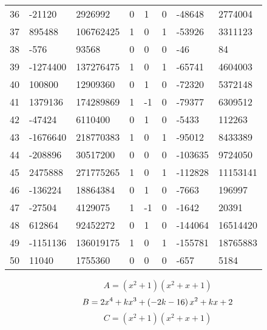 \documentclass{amsart}
\begin{document}
\begin{longtable}{|l|l|l|lllll|}
36&-21120&2926992&0&1&0&-48648&2774004\\
37&895488&106762425&1&0&1&-53926&3311123\\
38&-576&93568&0&0&0&-46&84\\
39&-1274400&137276475&1&0&1&-65741&4604003\\
40&100800&12909360&0&1&0&-72320&5372148\\
41&1379136&174289869&1&-1&0&-79377&6309512\\
42&-47424&6110400&0&1&0&-5433&112263\\
43&-1676640&218770383&1&0&1&-95012&8433389\\
44&-208896&30517200&0&0&0&-103635&9724050\\
45&2475888&271775265&1&0&1&-112828&11153141\\
46&-136224&18864384&0&1&0&-7663&196997\\
47&-27504&4129075&1&-1&0&-1642&20391\\
48&612864&92452272&0&1&0&-144064&16514420\\
49&-1151136&136019175&1&0&1&-155781&18765883\\
50&11040&1755360&0&0&0&-657&5184\\
\hline
\end{longtable}
$$A=(x^2
 + 1)(x^2
 + x
 + 1)$$
$$B=2\*x^4
 + k\*x^3
 + \left(-2\*k
 - 16\right) \*x^2
 + k\*x
 + 2$$
$$C=(x^2
 + 1)(x^2
 + x
 + 1)$$
\end{document}
